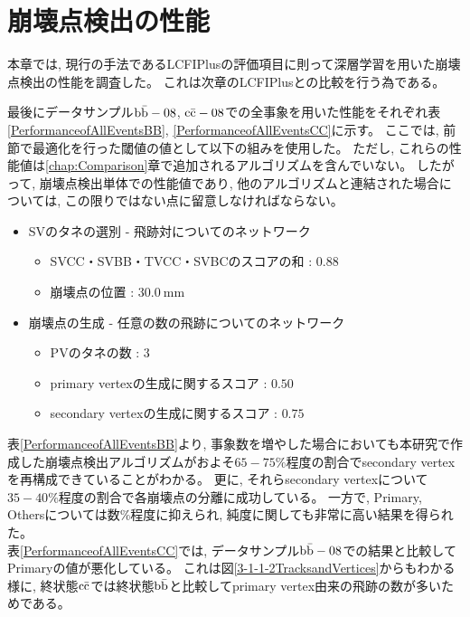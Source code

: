 \section{崩壊点検出の性能} \label{VFDL:SummaryofVFDL}

本章では, 現行の手法であるLCFIPlusの評価項目に則って深層学習を用いた崩壊点検出の性能を調査した。
これは次章のLCFIPlusとの比較を行う為である。

最後にデータサンプル$\rm b\bar{b}-08$, $\rm c\bar{c}-08$での全事象を用いた性能をそれぞれ表\ref{PerformanceofAllEventsBB}, \ref{PerformanceofAllEventsCC}に示す。
ここでは, 前節で最適化を行った閾値の値として以下の組みを使用した。
ただし, これらの性能値は\ref{chap:Comparison}章で追加されるアルゴリズムを含んでいない。
したがって, 崩壊点検出単体での性能値であり, 他のアルゴリズムと連結された場合については, この限りではない点に留意しなければならない。

\begin{itemize}
 \item SVのタネの選別 - 飛跡対についてのネットワーク
 \begin{itemize}
   \item SVCC・SVBB・TVCC・SVBCのスコアの和 : $0.88$
   \item 崩壊点の位置 : $30.0\ {\mathrm{mm}}$
 \end{itemize}
 \item 崩壊点の生成 - 任意の数の飛跡についてのネットワーク
 \begin{itemize}
   \item PVのタネの数 : $3$
   \item primary vertexの生成に関するスコア : $0.50$
   \item secondary vertexの生成に関するスコア : $0.75$
 \end{itemize}
\end{itemize}

表\ref{PerformanceofAllEventsBB}より, 事象数を増やした場合においても本研究で作成した崩壊点検出アルゴリズムがおよそ$65 - 75\%$程度の割合でsecondary vertexを再構成できていることがわかる。
更に, それらsecondary vertexについて$35 - 40\%$程度の割合で各崩壊点の分離に成功している。
一方で, Primary, Othersについては数\%程度に抑えられ, 純度に関しても非常に高い結果を得られた。\\

表\ref{PerformanceofAllEventsCC}では, データサンプル$\rm b\bar{b}-08$での結果と比較してPrimaryの値が悪化している。
これは図\ref{3-1-1-2TracksandVertices}からもわかる様に, 終状態$\rm c\bar{c}$では終状態$\rm b\bar{b}$と比較してprimary vertex由来の飛跡の数が多いためである。


